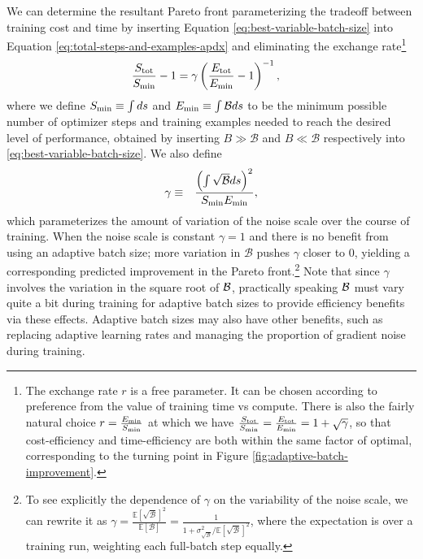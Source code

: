 \documentclass[english]{article}
\newcommand{\CB}{{\cal B}}
\begin{document}
We can determine the resultant Pareto front parameterizing the tradeoff between training cost and time by inserting Equation \ref{eq:best-variable-batch-size} into Equation \ref{eq:total-steps-and-examples-apdx} and eliminating the exchange rate\footnote{The exchange rate $r$ is a free parameter. It can be chosen according to preference from the value of training time vs compute.
There is also the fairly natural choice $r=\frac{E_{{\rm min}}}{S_{{\rm min}}}$ at which we have $\frac{S_{{\rm tot}}}{S_{{\rm min}}}=\frac{E_{{\rm tot}}}{E_{{\rm min}}}=1+\sqrt{\gamma}$, so that cost-efficiency and time-efficiency are both within the same factor of optimal, corresponding to the turning point in Figure \ref{fig:adaptive-batch-improvement}.}
\begin{align}
\frac{S_{{\rm tot}}}{S_{{\rm min}}}-1 & =\gamma\left(\frac{E_{{\rm tot}}}{E_{{\rm min}}}-1\right)^{-1},
\end{align}
where we define $S_{{\rm min}}\equiv\int ds$ and $E_{{\rm min}}\equiv\int\mathcal{B}ds$ to be the minimum possible number of optimizer steps and training examples needed to reach the desired level of performance, obtained by inserting $B\gg\mathcal{B}$ and $B\ll\mathcal{B}$ respectively into \ref{eq:best-variable-batch-size}. We also define
\begin{eqnarray}
\gamma & \equiv & \frac{\left(\int\sqrt{\mathcal{B}}ds\right)^{2}}{S_{{\rm min}}E_{{\rm min}}},\label{eq:gamma}
\end{eqnarray}
which parameterizes the amount of variation of the noise scale over the course of training. When the noise scale is constant $\gamma=1$ and there is no benefit from using an adaptive batch size; more variation in $\mathcal{B}$ pushes $\gamma$ closer to 0, yielding a corresponding predicted improvement in the Pareto front.\footnote{To see explicitly the dependence of $\gamma$ on the variability of the noise scale, we can rewrite it as $\gamma=\frac{\mathbb{E}\left[\sqrt{\mathcal{B}}\right]^{2}}{\mathbb{E}\left[\mathcal{B}\right]}=\frac{1}{1+\sigma_{\sqrt{\mathcal{B}}}^{2}/\mathbb{E}\left[\sqrt{\mathcal{B}}\right]^{2}}$, where the expectation is over a training run, weighting each full-batch step equally.} Note that since $\gamma$ involves the variation in the square root of $\CB$, practically speaking $\CB$ must vary quite a bit during training for adaptive batch sizes to provide efficiency benefits via these effects. Adaptive batch sizes may also have other benefits, such as replacing adaptive learning rates \cite{1711.00489} and managing the proportion of gradient noise during training.
\end{document}
